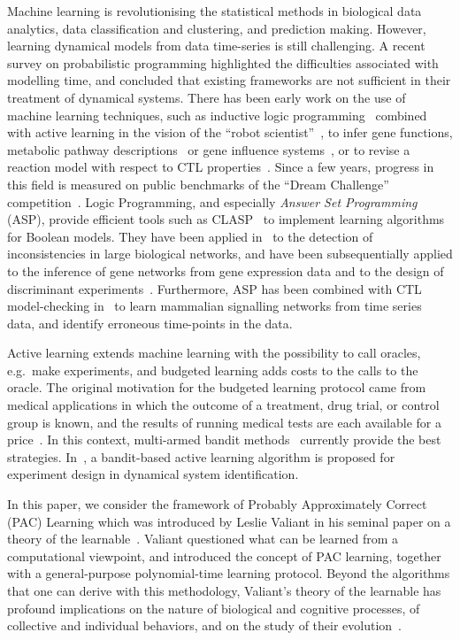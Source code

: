 \documentclass{llncs}
\begin{document}
Machine learning is revolutionising the statistical methods in biological data analytics,
data classification and clustering, and prediction making.
However, learning dynamical models from data time-series is still challenging.
A recent survey on probabilistic programming \cite{GHNR14fose}
highlighted the difficulties associated with modelling time,
and concluded that existing frameworks are not sufficient in their treatment of dynamical systems.
There has been early work on the use of machine learning techniques, such as inductive
 logic programming~\cite{Muggleton95ngc} combined with active learning in the vision of the ``robot scientist''~\cite{BMOKRK01etai},
to infer gene functions,
metabolic pathway descriptions~\cite{AM02etai,AM02slps}
or gene influence systems~\cite{BCRG04jtb},
or to revise a reaction model with respect to CTL properties~\cite{CCFS06tcsb}.
Since a few years, progress in this field is measured on public benchmarks
of the ``Dream Challenge'' competition~\cite{Meyer14bmc}.
Logic Programming, and especially \emph{Answer Set Programming} (ASP), provide efficient tools such as CLASP~\cite{GKNS07lpnmr}
to implement learning algorithms for Boolean models.
They have been applied in~\cite{GSTUV08iclp} to the detection of  inconsistencies in large biological networks,
and have been subsequentially applied to the inference of gene networks from gene expression data and to the design of discriminant experiments~\cite{VKASSSG15frontiers}.
Furthermore, ASP has been combined with CTL model-checking in~\cite{OPSSG16biosystems} to learn mammalian signalling networks from time series data,
and identify erroneous time-points in the data.

Active learning extends machine learning with the possibility to call oracles, e.g.~make experiments,
and budgeted learning adds costs to the calls to the oracle.
The original motivation for the budgeted learning protocol came from medical applications in which the outcome of a treatment,
drug trial, or control group is known, and the results of running medical tests are each available for a price~\cite{DZBSM13ml}.
In this context, multi-armed bandit methods~\cite{DBSSZ07icdm} currently provide the best strategies.
In~\cite{LMALS14ecml}, a bandit-based active learning algorithm is proposed for experiment design in dynamical system identification.

In this paper, we consider the framework of Probably Approximately Correct (PAC) Learning 
which was introduced by Leslie Valiant in his seminal paper on a theory of the learnable~\cite{Valiant84cacm}.
Valiant questioned what can be learned from a computational viewpoint,
and introduced the concept of PAC learning,
together with a general-purpose polynomial-time learning protocol.
Beyond the algorithms that one can derive with this methodology,
Valiant's theory of the learnable has profound implications
on the nature of biological and cognitive processes,
of collective and individual behaviors,
and on the study of their evolution~\cite{Valiant13book}.
\end{document}
